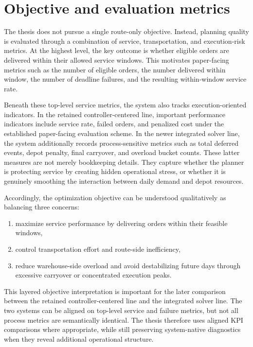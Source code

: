 \section{Objective and evaluation metrics}

The thesis does not pursue a single route-only objective. Instead, planning quality is evaluated through a combination of service, transportation, and execution-risk metrics. At the highest level, the key outcome is whether eligible orders are delivered within their allowed service windows. This motivates paper-facing metrics such as the number of eligible orders, the number delivered within window, the number of deadline failures, and the resulting within-window service rate.

Beneath these top-level service metrics, the system also tracks execution-oriented indicators. In the retained controller-centered line, important performance indicators include service rate, failed orders, and penalized cost under the established paper-facing evaluation scheme. In the newer integrated solver line, the system additionally records process-sensitive metrics such as total deferred events, depot penalty, final carryover, and overload bucket counts. These latter measures are not merely bookkeeping details. They capture whether the planner is protecting service by creating hidden operational stress, or whether it is genuinely smoothing the interaction between daily demand and depot resources.

Accordingly, the optimization objective can be understood qualitatively as balancing three concerns:
\begin{enumerate}
    \item maximize service performance by delivering orders within their feasible windows,
    \item control transportation effort and route-side inefficiency,
    \item reduce warehouse-side overload and avoid destabilizing future days through excessive carryover or concentrated execution peaks.
\end{enumerate}

This layered objective interpretation is important for the later comparison between the retained controller-centered line and the integrated solver line. The two systems can be aligned on top-level service and failure metrics, but not all process metrics are semantically identical. The thesis therefore uses aligned KPI comparisons where appropriate, while still preserving system-native diagnostics when they reveal additional operational structure.

